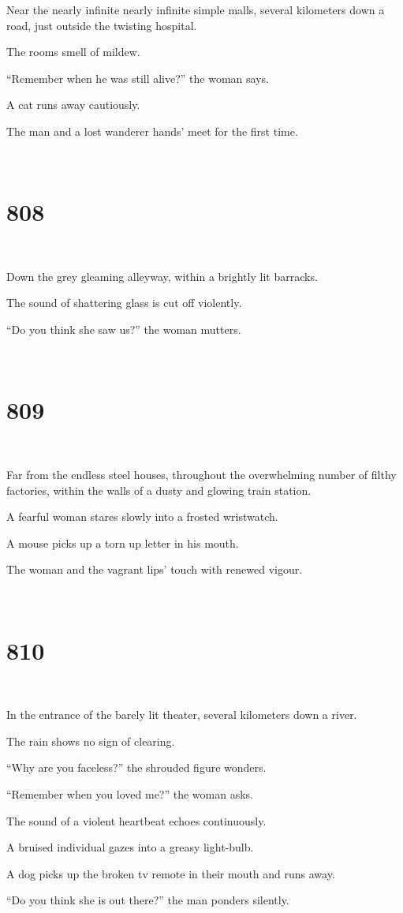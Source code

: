 \documentclass{report}
\begin{document}
Near the nearly infinite nearly infinite simple malls, several kilometers down a road, just outside the twisting hospital.

The rooms smell of mildew.

``Remember when he was still alive?'' the woman says.

A cat runs away cautiously.

The man and a lost wanderer hands' meet for the first time.

~
\chapter*{808}
~

Down the grey gleaming alleyway, within a brightly lit barracks.

The sound of shattering glass is cut off violently.

``Do you think she saw us?'' the woman mutters.

~
\chapter*{809}
~

Far from the endless steel houses, throughout the overwhelming number of filthy factories, within the walls of a dusty and glowing train station.

A fearful woman stares slowly into a frosted wristwatch.

A mouse picks up a torn up letter in his mouth.

The woman and the vagrant lips' touch with renewed vigour.

~
\chapter*{810}
~

In the entrance of the barely lit theater, several kilometers down a river.

The rain shows no sign of clearing.

``Why are you faceless?'' the shrouded figure wonders.

``Remember when you loved me?'' the woman asks.

The sound of a violent heartbeat echoes continuously.

A bruised individual gazes into a greasy light-bulb.

A dog picks up the broken tv remote in their mouth and runs away.

``Do you think she is out there?'' the man ponders silently.
\end{document}
